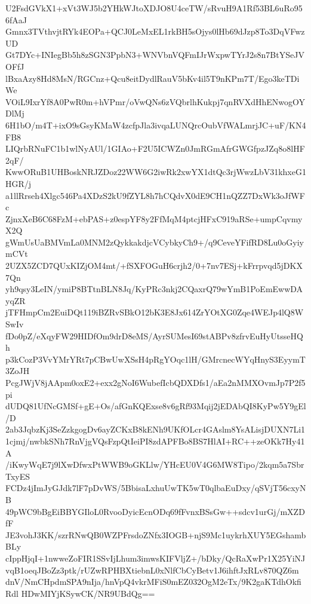 U2FsdGVkX1+xVt3WJ5b2YHkWJtoXDJO8U4ceTW/sRvuH9A1Rf53BL6uRo956fAaJ
Gmnx3TVthvjtRYk4EOPa+QCJ0LeMxEL1rkBH5sOjys0lHb69dJzp8To3DqVFwzUD
Gt7DYc+INIegBb5h8zSGN3PpbN3+WNVbnVQFmIJrWxpwTYrJ2s8n7BtYSeJVOFfJ
lBxaAzy8Hd8MsN/RGCnz+Qcu8eitDydlRauV5bKv4il5T9nKPm7T/Ego3keTDiWe
VOiL9IxrYf8A0PwR0m+hVPmr/oVwQNs6zVQbrlhKukpj7qnRVXdHhENwogOYDlMj
6H1bO/m4T+ixO9sGsyKMaW4zcfpJla3ivqaLUNQrcOubVfWALmrjJC+uF/KN4FB8
LIQrbRNuFC1b1wlNyAUl/1GIAo+F2U5ICWZn0JmRGmAfrGWGfpzJZq8o8lHF2qF/
KwwORuB1UHBoskNRJZDoz22WW6G2iwRk2xwYX1dtQc3rjWwzLbV31khxeG1HGR/j
a1llRrseh4Xlgc546Pa4XDzS2kU9fZYL8h7hCQdvX0dE9CH1nQZZ7DxWk3oJfWFc
ZjnxXeB6C68FzM+ebPAS+z0espYF8y2FfMqM4ptcjHFxC919aRSe+umpCqvmyX2Q
gWmUsUaBMVmLa0MNM2zQykkakdjcVCybkyCh9+/q9CeveYFifRD8Lu0oGyiymCVt
2UZX5ZCD7QUxKIZjOM4mt/+fSXFOGuH6crjh2/0+7nv7ESj+kFrrpvqd5jDKX7Qn
yh9qsy3LeIN/ymiP8BTtnBLN8Jq/KyPRc3nkj2CQaxrQ79wYmB1PoEmEwwDAyqZR
jTFHmpCm2EuiDQt119iBZRvSBkO12bK3E8Jx614ZrYOtXG0Zqe4WEJp4lQ8WSwIv
fDo0pZ/eXqyFW29HIDfOm9drD8eMS/AyrSUMesI69stABPv8zfrvEuHyUtsseHQh
p3kCozP3VvYMrYRt7pCBwUwXSsH4pRgYOqc1lH/GMrcnecWYqHnyS3EyymT3ZoJH
PcgJWjV8jAApm0oxE2+exx2gNoI6WubefIcbQDXDfs1/aEa2nMMXOvmJp7P2f5pi
dUDQ81UfNcGMSf+gE+Os/afGnKQExse8v6gRf93Mqij2jEDAbQI8KyPw5Y9gEl/D
2ab3JqbzKj3SeZzkgogDv6ayZCKxB8kENh9UKfOLcr4GAslm8YsALisjDUXN7Li1
1cjmj/nwbkSNh7RnVjgVQsFzpQtIeiPI8zdAPFBo8BS7HlAI+RC++zeOKk7Hy41A
/iKwyWqE7j9lXwDfwxPtWWB9oGKLlw/YHcEU0V4G6MW8Tipo/2kqm5a7SbrTxyES
FCDz4jImJyGJdk7lF7pDvWS/5BbisaLxhuUwTK5wT0qlbaEuDxy/qSVjT56cxyNB
49pWC9bBgEiBBYGIloL0RvooDyicEcnODq69fFvnxBSsGw++sdcv1urGj/mXZDfF
JE3vohJ3KK/szrRNwQB0WZPFrsdoZNfx3IOGB+njS9Mc1uykrhXUY5EGshambBLy
cIppHjqI+1nwweZoFIR1SSvIjLhum3imwsKIFVljZ+/bDky/QcRaXwPr1X25YiNJ
vqB1oeqJBoZz3ptk/rUZwRPHBXtiebnL0xNlfCbCyBetv1J6ihftJxRLv870QZ6m
dnV/NmCHpdmSPA9nIja/hnVpQ4vkrMFiS0mEZ032OgM2eTx/9K2gaKTdhOkfiRdl
HDwMIYjKSywCK/NR9UBdQg==
